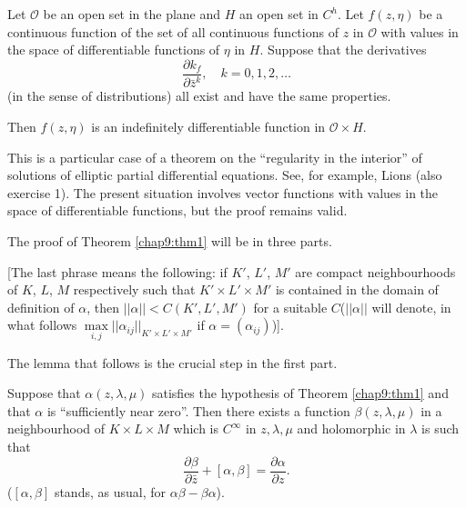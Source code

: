 \begin{lem}\label{chap9:lem2}
Let $\mathscr{O}$ be an open set in the plane and $H$ an open set in
$C^h$. Let $f(z, \eta)$ be a continuous function of the set of all
continuous functions of $z$ in $\mathscr{O}$ with values in the space
of differentiable functions of $\eta$ in $H$. Suppose that the
derivatives
$$
\frac{\partial k_f}{\partial \bar{z}^k}, \quad k =0, 1, 2, \ldots
$$
(in the sense of distributions) all exist and have the same
properties. 

Then $f(z, \eta)$ is an indefinitely differentiable function in
$\mathscr{O} \times H$. 

This is a particular case of a theorem on the ``regularity in the
interior'' of solutions of elliptic partial differential
equations. See, for example, Lions \cite{p2:key5} (also exercise 1). The
present situation involves vector functions with values in the space
of differentiable functions, but the proof remains valid.
\end{lem}

The proof of Theorem \ref{chap9:thm1} will be in three parts. 

\medskip
{} 
[The last phrase means the following: if $K'$, $L'$, $M'$ are compact
  neighbourhoods of $K$, $L$, $M$ respectively such that $K' \times L'
  \times M'$ is contained in the domain of definition of $\alpha$,
  then $||\alpha|| < C (K', L', M')$ for a suitable $C$($||\alpha||$
  will denote, in what follows
  $\max\limits_{i,j}||\alpha_{ij}||_{K'\times L'\times M'}$ if $\alpha 
  = (\alpha_{ij})$)].

The lemma that follows is the crucial step in the first part. 

\begin{lem}\label{chap9:lem3}
Suppose that $\alpha (z, \lambda, \mu)$ satisfies the hypothesis of
Theorem \ref{chap9:thm1} and that $\alpha$ is ``sufficiently near
zero''. Then there exists a function $\beta (z, \lambda, \mu)$ in a
neighbourhood of $K \times L \times M$ which is $C^\infty$ in $z,
\lambda, \mu$ and holomorphic in $\lambda$ is such that  
$$
\frac{\partial \beta}{\partial \bar{z}} + [\alpha, \beta] =
\frac{\partial \alpha}{\partial z}.
$$
($[\alpha, \beta]$ stands, as usual, for $\alpha \beta - \beta \alpha$).
\end{lem}

